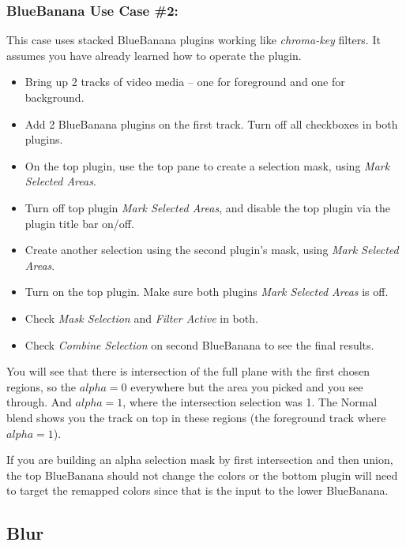 \subsubsection*{BlueBanana Use Case \#2:}
\label{ssub:bb_use_case_2}

This case uses stacked BlueBanana plugins working like \textit{chroma-key} filters. It assumes you have already learned how to operate the plugin.

\begin{itemize}
        \item Bring up 2 tracks of video media -- one for foreground and one for background.
        \item Add 2 BlueBanana plugins on the first track. Turn off all checkboxes in both plugins.
        \item On the top plugin, use the top pane to create a selection mask, using \textit{Mark Selected Areas}.
        \item Turn off top plugin \textit{Mark Selected Areas}, and disable the top plugin via the plugin title bar on/off.
        \item Create another selection using the second plugin's mask, using \textit{Mark Selec\-ted Areas}.
        \item Turn on the top plugin. Make sure both plugins \textit{Mark Selected Areas} is off.
        \item Check \textit{Mask Selection} and \textit{Filter Active} in both.
        \item Check \textit{Combine Selection} on second BlueBanana to see the final results.
\end{itemize}

You will see that there is intersection of the full plane with the first chosen regions, so the $alpha = 0$ everywhere but the area you picked and you see through. And $alpha = 1$, where the intersection selection was 1. The Normal blend shows you the track on top in these regions (the foreground track where $alpha = 1$).

If you are building an alpha selection mask by first intersection and then union, the top BlueBanana should not change the colors or the bottom plugin will need to target the remapped colors since that is the input to the lower BlueBanana.

\subsection{Blur}%
\label{sub:blur}

